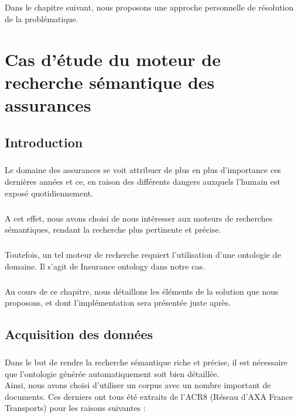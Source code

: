 \documentclass[12pt, a4paper, oneside]{book}
\begin{document}
\paragraph{}
Dans le chapitre suivant, nous proposons une approche personnelle de résolution de la problématique.


\chapter{Cas d'étude du moteur de recherche sémantique des assurances}

\section{Introduction}

\paragraph{}
Le domaine des assurances se voit attribuer de plus en plus d'importance ces dernières années et ce, en raison des différents dangers auxquels l'humain est exposé quotidiennement.
\paragraph{}
A cet effet, nous avons choisi de nous intéresser aux moteurs de recherches sémantiques, rendant la recherche plus pertinente et précise.
\paragraph{}
Toutefois, un tel moteur de recherche requiert l'utilisation d'une ontologie de domaine. Il s'agit de Insurance ontology dans notre cas. 
\paragraph{}
Au cours de ce chapitre, nous détaillons les éléments de la solution que nous proposons, et dont l'implémentation sera présentée juste après.

\section{Acquisition des données}

\paragraph{}
Dans le but de rendre la recherche sémantique riche et précise, il est nécessaire que l'ontologie générée automatiquement soit bien détaillée.\\
Ainsi, nous avons choisi d'utiliser un corpus avec un nombre important de documents. Ces derniers ont tous été extraits de l'ACR8 (Réseau d'AXA France Transports) pour les raisons suivantes : 
\end{document}
